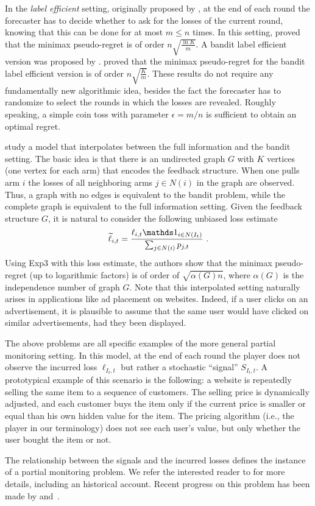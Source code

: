 In the {\em label efficient} setting, originally proposed by \cite{HP97}, at the end of each round the forecaster has to decide whether to ask for the losses of the current round, knowing that this can be done for at most $m \leq n$ times. In this setting, \cite{CLS05} proved that the minimax pseudo-regret is of order $n \sqrt{\frac{\ln K}{m}}$. A bandit label efficient version was proposed by \cite{AAGO06}. \cite{AB10} proved that the minimax pseudo-regret for the bandit label efficient version is of order $n \sqrt{\frac{K}{m}}$. These results do not require any fundamentally new algorithmic idea, besides the fact the forecaster has to randomize to select the rounds in which the losses are revealed. Roughly speaking, a simple coin toss with parameter $\epsilon = m/n$ is sufficient to obtain an optimal regret.

\cite{MS11} study a model that interpolates between the full information and the bandit setting. The basic idea is that there is an undirected graph $G$ with $K$ vertices (one vertex for each arm) that encodes the feedback structure. When one pulls arm $i$ the losses of all neighboring arms $j \in N(i)$ in the graph are observed. Thus, a graph with no edges is equivalent to the bandit problem, while the complete graph is equivalent to the full information setting. Given the feedback structure $G$, it is natural to consider the following unbiased loss estimate
\[
    \tilde{\ell}_{i,t} = \frac{\ell_{i,t} \ds1_{i \in N(I_t)}}{\sum_{j \in N(i)} p_{j,t}}~.
\]
Using Exp3 with this loss estimate, the authors show that the minimax pseudo-regret (up to logarithmic factors) is of order of $\sqrt{\alpha(G) n}$, where $\alpha(G)$ is the independence number of graph $G$. Note that this interpolated setting naturally arises in applications like ad placement on websites. Indeed, if a user clicks on an advertisement, it is plausible to assume that the same user would have clicked on similar advertisements, had they been displayed.

The above problems are all specific examples of the more general partial monitoring setting. In this model, at the end of each round the player does not observe the incurred loss $\ell_{I_t,t}$ but rather a stochastic ``signal'' $S_{I_t,t}$. A prototypical example of this scenario is the following: a website is repeatedly selling the same item to a sequence of customers. The selling price is dynamically adjusted, and each customer buys the item only if the current price is smaller or equal than his own hidden value for the item. The pricing algorithm (i.e., the player in our terminology) does not see each user's value, but only whether the user bought the item or not.

The relationship between the signals and the incurred losses defines the instance of a partial monitoring problem. We refer the interested reader to \cite{CL06} for more details, including an historical account. Recent progress on this problem has been made by \cite{BPS10} and~\cite{FR11}.
